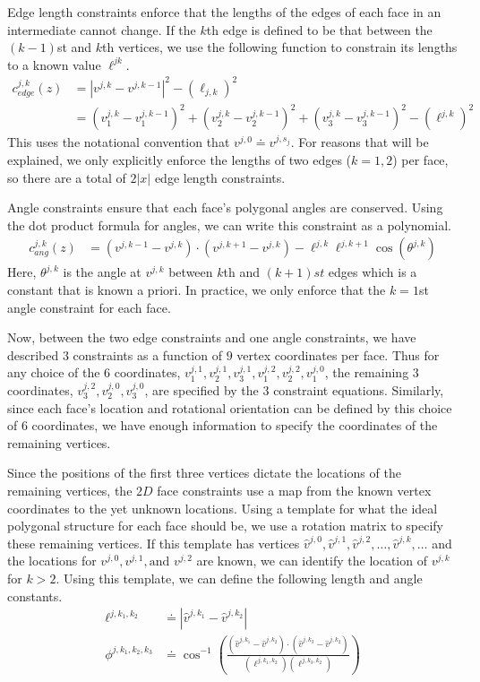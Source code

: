 Edge length constraints enforce that the lengths of the edges of each face in an intermediate cannot change. If the $k$th edge is defined to be that between the $(k-1)$st and $k$th vertices, we use the following function to constrain its lengths to a known value $\ell^{jk}$.
\begin{align}
c_{edge}^{j,k}\left(z\right)& = \left|v^{j,k} - v^{j,k-1}\right|^2 - (\ell_{j,k})^2 \\
& = \left(v_1^{j,k} - v_1^{j,k-1}\right)^2 +\left(v_2^{j,k} - v_2^{j,k-1}\right)^2 +\left(v_3^{j,k} - v_3^{j,k-1}\right)^2 - (\ell^{j,k})^2 
\end{align}  
This uses the notational convention that $v^{j,0} \doteq v^{j,s_j}$. For reasons that will be explained, we only explicitly enforce the lengths of two edges ($k=1,2$) per face, so there are a total of $2|x|$ edge length constraints. 

Angle constraints ensure that each face's polygonal angles are conserved. Using the dot product formula for angles, we can write this constraint as a polynomial.
\begin{align}
c_{ang}^{j,k}\left(z\right) &= (v^{j,k-1} - v^{j,k})\cdot(v^{j,k+1} - v^{j,k})  - \ell^{j,k}\ell^{j,k+1}\cos(\theta^{j,k})
\end{align}  
Here, $\theta^{j,k}$ is the angle at $v^{j,k}$ between $k$th and $(k+1)st$ edges which is a constant that is known a priori. In practice, we only enforce that the $k=1$st angle constraint for each face.

Now, between the two edge constraints and one angle constraints, we have described $3$ constraints as a function of $9$ vertex coordinates per face. Thus for any choice of the $6$ coordinates, $v^{j,1}_1, v^{j,1}_2, v^{j,1}_3, v^{j,2}_1, v^{j,2}_2, v^{j,0}_1$, the remaining $3$ coordinates, $v^{j,2}_3, v^{j,0}_2, v^{j,0}_3$, are specified by the $3$ constraint equations. Similarly, since each face's location and rotational orientation can be defined by this choice of $6$ coordinates, we have enough information to specify the coordinates of the remaining vertices. 

Since the positions of the first three vertices dictate the locations of the remaining vertices, the $2D$ face constraints use a map from the known vertex coordinates to the yet unknown locations. Using a template for what the ideal polygonal structure for each face should be, we use a rotation matrix to specify these remaining vertices. If this template has vertices $\hat{v}^{j,0}, \hat{v}^{j,1}, \hat{v}^{j,2}, \dots, \hat{v}^{j,k}, \dots$ and the locations for $v^{j,0}, v^{j,1}, \text{and } v^{j,2}$ are known, we can identify the location of $v^{j,k}$ for $k>2$. Using this template, we can define the following length and angle constants.
\begin{align}
\ell^{j,k_1, k_2} &\doteq |\hat{v}^{j,k_1} - \hat{v}^{j,k_2}| \\ 
\phi^{j,k_1,k_2,k_3} &\doteq \cos^{-1}\left(\frac{\left(\hat{v}^{j,k_1} - \hat{v}^{j,k_2}\right)\cdot\left(\hat{v}^{j,k_3} - \hat{v}^{j,k_2}\right)}{(\ell^{j,k_1, k_2})(\ell^{j,k_3, k_2})}\right)   
\end{align}

